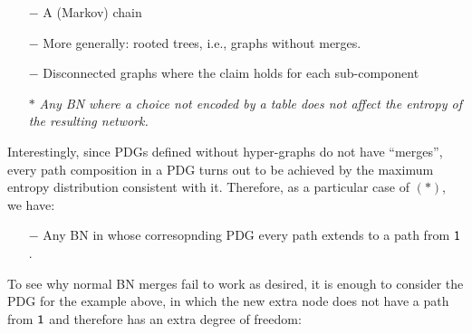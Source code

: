 \documentclass{article}
\begin{document}
	\begin{itemize}[itemsep=-0.1em]
		\item[$-$] A (Markov) chain
		\item[$-$] More generally: rooted trees, i.e., graphs without merges.
		\item[$-$] Disconnected graphs where the claim holds for each sub-component
		\item[$\boldsymbol\ast$] \textit{Any BN where a choice not encoded by a table does not affect the entropy of the resulting network.}
	\end{itemize}
	
	Interestingly, since PDGs defined without hyper-graphs do not have ``merges'', every path composition in a PDG turns out to be achieved by the maximum entropy distribution consistent with it. Therefore, as a particular case of  
	$(\boldsymbol\ast)$, we have:
	
	\begin{itemize}[nosep]
		\item[$-$] Any BN in whose corresopnding PDG every path extends to a path from $\sf 1$.
	\end{itemize}

	To see why normal BN merges fail to work as desired, it is enough to consider the PDG for the example above, in which the new extra node does not have a path from $\sf 1$ and therefore has an extra degree of freedom:

	\begin{center}
	\end{center}
		
\end{document}
